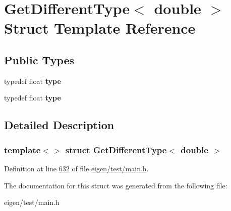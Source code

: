 \hypertarget{struct_get_different_type_3_01double_01_4}{}\section{Get\+Different\+Type$<$ double $>$ Struct Template Reference}
\label{struct_get_different_type_3_01double_01_4}
\subsection*{Public Types}
\begin{DoxyCompactItemize}
\item 
\mbox{\label{struct_get_different_type_3_01double_01_4_a250594e71971afccad4fb5bb07b4d026}} 
typedef float {\bfseries type}
\item 
\mbox{\label{struct_get_different_type_3_01double_01_4_a250594e71971afccad4fb5bb07b4d026}} 
typedef float {\bfseries type}
\end{DoxyCompactItemize}


\subsection{Detailed Description}
\subsubsection*{template$<$$>$\newline
struct Get\+Different\+Type$<$ double $>$}



Definition at line \hyperlink{eigen_2test_2main_8h_source_l00632}{632} of file \hyperlink{eigen_2test_2main_8h_source}{eigen/test/main.\+h}.



The documentation for this struct was generated from the following file\+:\begin{DoxyCompactItemize}
\item 
eigen/test/main.\+h\end{DoxyCompactItemize}
